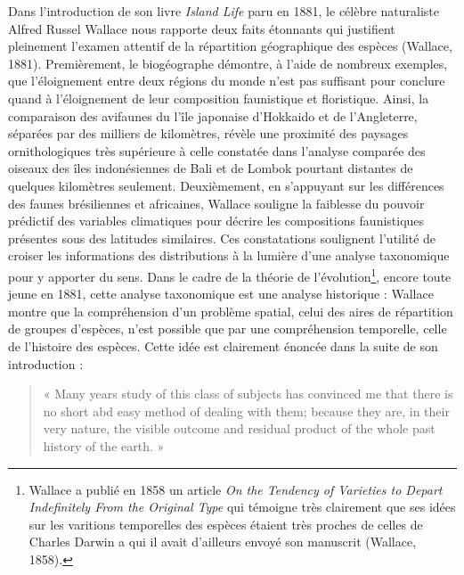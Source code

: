 Dans l'introduction de son livre \emph{Island Life} paru en 1881, le
célèbre naturaliste Alfred Russel Wallace nous rapporte deux faits
étonnants qui justifient pleinement l'examen attentif de la répartition
géographique des espèces (Wallace, 1881). Premièrement, le biogéographe
démontre, à l'aide de nombreux exemples, que l'éloignement entre deux
régions du monde n'est pas suffisant pour conclure quand à l'éloignement
de leur composition faunistique et floristique. Ainsi, la comparaison
des avifaunes du l'île japonaise d'Hokkaido et de l'Angleterre, séparées
par des milliers de kilomètres, révèle une proximité des paysages
ornithologiques très supérieure à celle constatée dans l'analyse
comparée des oiseaux des îles indonésiennes de Bali et de Lombok
pourtant distantes de quelques kilomètres seulement. Deuxièmement, en
s'appuyant sur les différences des faunes brésiliennes et africaines,
Wallace souligne la faiblesse du pouvoir prédictif des variables
climatiques pour décrire les compositions faunistiques présentes sous
des latitudes similaires. Ces constatations soulignent l'utilité de
croiser les informations des distributions à la lumière d'une analyse
taxonomique pour y apporter du sens. Dans le cadre de la théorie de
l'évolution\footnote{Wallace a publié en 1858 un article \emph{On the
  Tendency of Varieties to Depart Indefinitely From the Original Type}
  qui témoigne très clairement que ses idées sur les varitions
  temporelles des espèces étaient très proches de celles de Charles
  Darwin a qui il avait d'ailleurs envoyé son manuscrit (Wallace, 1858).},
encore toute jeune en 1881, cette analyse taxonomique est une analyse
historique : Wallace montre que la compréhension d'un problème spatial,
celui des aires de répartition de groupes d'espèces, n'est possible que
par une compréhension temporelle, celle de l'histoire des espèces. Cette
idée est clairement énoncée dans la suite de son introduction :

\begin{quote}
« Many years study of this class of subjects has convinced me that there
is no short abd easy method of dealing with them; because they are, in
their very nature, the visible outcome and residual product of the whole
past history of the earth. »
\end{quote}

